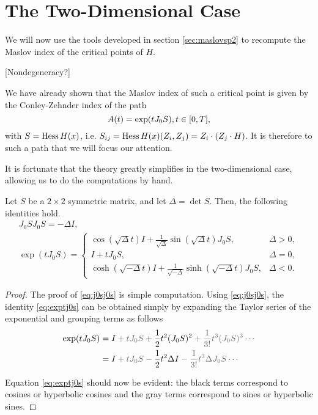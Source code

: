 \section{The Two-Dimensional Case}

We will now use the tools developed in section \ref{sec:maslovsp2} to recompute the Maslov index of the critical points of $H$.

[Nondegeneracy?]

We have already shown that the Maslov index of such a critical point is given by the Conley-Zehnder index of the path
\begin{equation}
A(t) = \exp(t J_0 S), t \in \interval 0 T,
\end{equation}
with $S = \operatorname{Hess} H(x)$, i.e. $S_{ij} = \operatorname{Hess} H(x)(Z_i, Z_j) = Z_i \cdot (Z_j \cdot H)$. It is therefore to such a path that we will focus our attention.

It is fortunate that the theory greatly simplifies in the two-dimensional case, allowing us to do the computations by hand.

\begin{prop}\label{prop:sidentities}
Let $S$ be a $2 \times 2$ symmetric matrix, and let $\Delta = \det S$. Then, the following identities hold.
\begin{gather}
J_0 S J_0 S = - \Delta I, \label{eq:j0sj0s}\\
\exp(t J_0 S) = \begin{cases}
\cos(\sqrt{\Delta} t) I + \frac1{\sqrt{\Delta}} \sin(\sqrt{\Delta} t) J_0 S, & \Delta > 0,\\
I + t J_0 S, & \Delta = 0,\\
\cosh(\sqrt{-\Delta} t) I + \frac1{\sqrt{-\Delta}} \sinh(\sqrt{-\Delta} t) J_0 S, & \Delta < 0.
\end{cases} \label{eq:exptj0s}
\end{gather}
\end{prop}

\begin{proof}
The proof of \eqref{eq:j0sj0s} is simple computation. Using \eqref{eq:j0sj0s}, the identity \eqref{eq:exptj0s} can be obtained simply by expanding the Taylor series of the exponential and grouping terms as follows
\begin{equation}
\begin{aligned}
\exp(t J_0 S) &= 
I \color{black!60} + t J_0 S \color{black} + \frac12 t^2 (J_0 S)^2 \color{black!60} +\frac1{3!} t^3 (J_0 S)^3 \color{black} \cdots \\
&= 
I \color{black!60} + t J_0 S \color{black} - \frac12 t^2 \Delta I \color{black!60} -\frac1{3!} t^3 \Delta J_0 S \color{black} \cdots
\end{aligned}
\end{equation}

Equation \eqref{eq:exptj0s} should now be evident: the black terms correspond to cosines or hyperbolic cosines and the gray terms correspond to sines or hyperbolic sines.
\end{proof}

